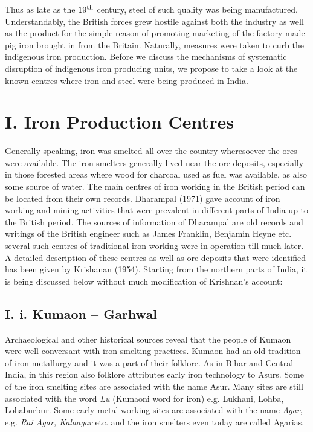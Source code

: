 Thus as late as the $19^{\rm th}$ century, steel of such quality was being manufactured. Understandably, the British forces grew hostile against both the industry as well as the product for the simple reason of promoting marketing of the factory made pig iron brought in from the Britain. Naturally, measures were taken to curb the indigenous iron production. Before we discuss the mechanisms of systematic disruption of indigenous iron producing units, we propose to take a look at the known centres where iron and steel were being produced in India. 

\vspace{-.3cm}

\section*{I. Iron Production Centres}\label{chapter6-section-1.1}

\vspace{-.2cm}

Generally speaking, iron was smelted all over the country wheresoever the ores were available.  The iron smelters generally lived near the ore deposits, especially in those forested areas where wood for charcoal used as fuel was available, as also some source of water. The main centres of iron working in the British period can be located from their own records. Dharampal (1971) gave account of iron working and mining activities that were prevalent in different parts of India up to the British period. The sources of information of Dharampal are old records and writings of the British engineer such as James Franklin, Benjamin Heyne etc. several such centres of traditional iron working were in operation till much later. A detailed description of these centres as well as ore deposits that were identified has been given by Krishanan (1954). Starting from the northern parts of India, it is being discussed below without much modification of Krishnan’s account:


\vspace{-.3cm}

\subsection*{I. i. Kumaon – Garhwal}\label{subsection-1}

\vspace{-.2cm}

Archaeological and other historical sources reveal that the people of Kumaon were well conversant with iron smelting practices. Kumaon had an old tradition of iron metallurgy and it was a part of their folklore. As in Bihar and Central India, in this region also folklore attributes early iron technology to Asurs. Some of the iron smelting sites are associated with the name Asur. Many sites are still associated with the word {\it Lu} (Kumaoni word for iron) e.g. Lukhani, Lohba, Lohaburbur. Some early metal working sites are associated with the name {\it Agar}, e.g. {\it Rai Agar, Kalaagar} etc. and the iron smelters even today are called Agarias.

